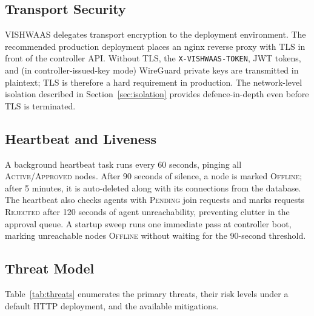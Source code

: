 \documentclass[conference]{IEEEtran}
\begin{document}
\subsection{Transport Security}
\label{sec:transport}

VISHWAAS delegates transport encryption to the deployment environment. The
recommended production deployment places an nginx reverse proxy with TLS in front
of the controller API. Without TLS, the \texttt{X-VISHWAAS-TOKEN}, JWT tokens,
and (in controller-issued-key mode) WireGuard private keys are transmitted in
plaintext; TLS is therefore a hard requirement in production. The network-level
isolation described in Section~\ref{sec:isolation} provides defence-in-depth even
before TLS is terminated.

\subsection{Heartbeat and Liveness}

A background heartbeat task runs every 60 seconds, pinging all
\textsc{Active}/\textsc{Approved} nodes. After 90 seconds of silence, a node is
marked \textsc{Offline}; after 5 minutes, it is auto-deleted along with its
connections from the database. The heartbeat also checks agents with
\textsc{Pending} join requests and marks requests \textsc{Rejected} after 120
seconds of agent unreachability, preventing clutter in the approval queue. A
startup sweep runs one immediate pass at controller boot, marking unreachable nodes
\textsc{Offline} without waiting for the 90-second threshold.

\subsection{Threat Model}

Table~\ref{tab:threats} enumerates the primary threats, their risk levels under a
default HTTP deployment, and the available mitigations.
\end{document}
